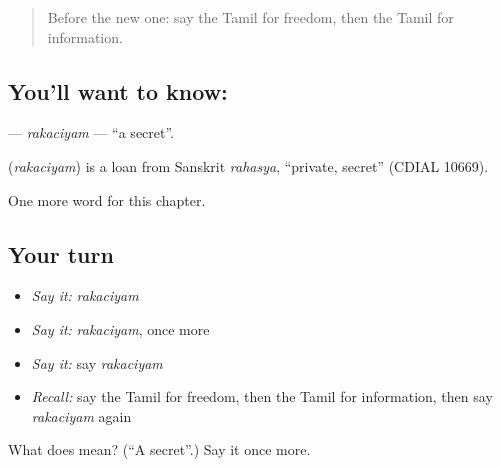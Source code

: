 \label{lesson:TA-C208-rakaciyam}



\begin{quote}
Before the new one: say the Tamil for freedom, then the Tamil for information.
\end{quote}

\subsection*{You'll want to know: }
\textbf{} — \emph{rakaciyam} — \textquotedblleft{}a secret\textquotedblright{}.

\begin{cousinweb}
\textbf{} (\emph{rakaciyam}) is a loan from Sanskrit \emph{rahasya}, \textquotedblleft{}private, secret\textquotedblright{} (CDIAL 10669).
\end{cousinweb}

\begin{grammarlens}[title={What you've built}]
One more word for this chapter.
\end{grammarlens}

\subsection*{Your turn}
\begin{itemize}
\raggedright
  \item \emph{Say it:} \emph{rakaciyam}
  \item \emph{Say it:} \emph{rakaciyam}, once more
  \item \emph{Say it:} say \emph{rakaciyam}
  \item \emph{Recall:} say the Tamil for freedom, then the Tamil for information, then say \emph{rakaciyam} again
\end{itemize}

\begin{tcolorbox}[breakable,colback=teal!4,colframe=teal!35!black,title={Before you move on}]
What does  mean? (\textquotedblleft{}A secret\textquotedblright{}.) Say it once more.
\end{tcolorbox}
